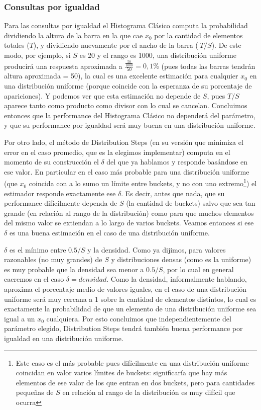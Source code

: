 \subsubsection{Consultas por igualdad}
Para las consultas por igualdad el Histograma Clásico computa la probabilidad dividiendo la altura de la barra en la que cae $x_0$ por la cantidad de elementos totales ($T$), y dividiendo nuevamente por el ancho de la barra ($~T/S$). De este modo, por ejemplo, si $S$ es 20 y el rango es 1000, una distribución uniforme producirá una respuesta aproximada a $\frac{\frac{50}{1000}}{50} = 0,1\%$ (pues todas las barras tendrán altura aproximada = 50), la cual es una excelente estimación para cualquier $x_0$ en una distribución uniforme (porque coincide con la esperanza de su porcentaje de apariciones). Y podemos ver que esta estimación no depende de $S$, pues $T/S$ aparece tanto como producto como divisor con lo cual se cancelan. Concluimos entonces que la performance del Histograma Clásico no dependerá del parámetro, y que su performance por igualdad será muy buena en una distribución uniforme.

Por otro lado, el método de Distribution Steps (en su versión que minimiza el error en el caso promedio, que es la elegimos implementar) computa en el momento de su construcción el $\delta$ del que ya hablamos y responde basándose en ese valor. En particular en el caso más probable para una distribución uniforme (que $x_0$ coincida con a lo sumo un límite entre buckets, y no con uno extremo\footnote{Este caso es el más probable pues difícilmente en una distribución uniforme coincidan en valor varios límites de buckets: significaría que hay más elementos de ese valor de los que entran en dos buckets, pero para cantidades pequeñas de $S$ en relación al rango de la distribución es muy difícil que ocurra}) el estimador responde exactamente ese $\delta$. Es decir, antes que nada, que su performance difícilmente dependa de $S$ (la cantidad de buckets) salvo que sea tan grande (en relación al rango de la distribución) como para que muchos elementos del mismo valor se extiendan a lo largo de varios buckets. Veamos entonces si ese $\delta$ es una buena estimación en el caso de una distribución uniforme.

$\delta$ es el mínimo entre $0.5/S$ y la densidad. Como ya dijimos, para valores razonables (no muy grandes) de $S$ y distribuciones densas (como es la uniforme) es muy probable que la densidad sea menor a $0.5/S$, por lo cual en general caeremos en el caso $\delta =  densidad$. Como la densidad, informalmente hablando, aproxima el porcentaje medio de valores iguales, en el caso de una distribución uniforme será muy cercana a $1$ sobre la cantidad de elementos distintos, lo cual es exactamente la probabilidad de que un elemento de una distribución uniforme sea igual a un $x_0$ cualquiera. Por esto concluimos que independientemente del parámetro elegido, Distribution Steps tendrá también buena performance por igualdad en una distribución uniforme.

